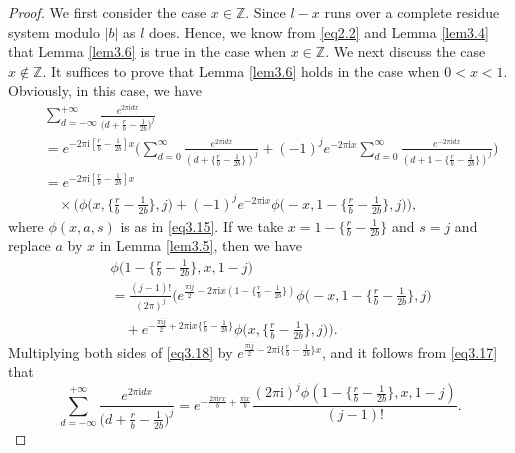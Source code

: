 \documentclass[reqno]{amsart}
\numberwithin{equation}{section}
\begin{document}
\begin{proof}
We first consider the case $x\in\mathbb{Z}$.
Since $l-x$ runs over a complete residue system modulo $|b|$ as
$l$ does. Hence, we know from \eqref{eq2.2} and Lemma \ref{lem3.4} that Lemma \ref{lem3.6} is true in the case when $x\in\mathbb{Z}$. We next discuss the case $x\not\in\mathbb{Z}$. It suffices to prove that Lemma \ref{lem3.6} holds in the case when $0<x<1$. Obviously, in this case, we have
\begin{eqnarray}\label{eq3.17}
&&\sum_{d=-\infty}^{+\infty}\frac{e^{2\pi \mathrm{i}dx}}{\bigl(d+\frac{r}{b}-\frac{1}{2b}\bigl)^{j}}\nonumber\\
&&=e^{-2\pi \mathrm{i}[\frac{r}{b}-\frac{1}{2b}]x}\biggl(\sum_{d=0}^{\infty}\frac{e^{2\pi \mathrm{i}dx}}{(d+\{\frac{r}{b}-\frac{1}{2b}\})^{j}}+(-1)^{j}e^{-2\pi \mathrm{i}x}\sum_{d=0}^{\infty}\frac{e^{-2\pi \mathrm{i}dx}}{(d+1-\{\frac{r}{b}-\frac{1}{2b}\})^{j}}\biggl)\nonumber\\
&&=e^{-2\pi \mathrm{i}[\frac{r}{b}-\frac{1}{2b}]x}\nonumber\\
&&\quad\times\biggl(\phi\biggl(x,\biggl\{\frac{r}{b}-\frac{1}{2b}\biggl\},j\biggl)
+(-1)^{j}e^{-2\pi \mathrm{i}x}\phi\biggl(-x,1-\biggl\{\frac{r}{b}-\frac{1}{2b}\biggl\},j\biggl)\biggl),
\end{eqnarray}
where $\phi(x,a,s)$ is as in \eqref{eq3.15}.
If we take $x=1-\{\frac{r}{b}-\frac{1}{2b}\}$ and $s=j$ and replace $a$ by $x$ in Lemma \ref{lem3.5}, then we have
\begin{eqnarray}\label{eq3.18}
&&\phi\biggl(1-\biggl\{\frac{r}{b}-\frac{1}{2b}\biggl\},x,1-j\biggl)\nonumber\\
&&=\frac{(j-1)!}{(2\pi)^{j}}\biggl(e^{\frac{\pi \mathrm{i}j}{2}-2\pi\mathrm{i}x(1-\{\frac{r}{b}-\frac{1}{2b}\})}\phi\biggl(-x,1-\biggl\{\frac{r}{b}-\frac{1}{2b}\biggl\},j\biggl)\nonumber\\
&&\quad+e^{-\frac{\pi \mathrm{i}j}{2}+2\pi\mathrm{i}x\{\frac{r}{b}-\frac{1}{2b}\}}\phi\biggl(x,\biggl\{\frac{r}{b}-\frac{1}{2b}\biggl\},j\biggl)\biggl).
\end{eqnarray}
Multiplying both sides of \eqref{eq3.18} by $e^{\frac{\pi \mathrm{i}j}{2}-2\pi\mathrm{i}\{\frac{r}{b}-\frac{1}{2b}\}x}$, and it follows from \eqref{eq3.17} that
\begin{equation}\label{eq3.19}
\sum_{d=-\infty}^{+\infty}\frac{e^{2\pi \mathrm{i}dx}}{\bigl(d+\frac{r}{b}-\frac{1}{2b}\bigl)^{j}}
=e^{-\frac{2\pi \mathrm{i}rx}{b}+\frac{\pi \mathrm{i}x}{b}}\frac{(2\pi \mathrm{i})^{j}\phi(1-\{\frac{r}{b}-\frac{1}{2b}\},x,1-j)}{(j-1)!}.
\end{equation}

\end{proof}
\end{document}

